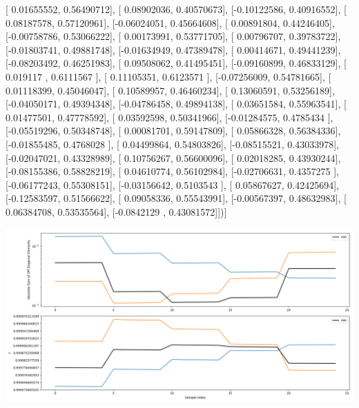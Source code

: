 \documentclass{article}
\begin{document}
       [ 0.01655552,  0.56490712],
       [ 0.08902036,  0.40570673],
       [-0.10122586,  0.40916552],
       [ 0.08187578,  0.57120961],
       [-0.06024051,  0.45664608],
       [ 0.00891804,  0.44246405],
       [-0.00758786,  0.53066222],
       [ 0.00173991,  0.53771705],
       [ 0.00796707,  0.39783722],
       [-0.01803741,  0.49881748],
       [-0.01634949,  0.47389478],
       [ 0.00414671,  0.49441239],
       [-0.08203492,  0.46251983],
       [ 0.09508062,  0.41495451],
       [-0.09160899,  0.46833129],
       [ 0.019117  ,  0.6111567 ],
       [ 0.11105351,  0.6123571 ],
       [-0.07256009,  0.54781665],
       [ 0.01118399,  0.45046047],
       [ 0.10589957,  0.46460234],
       [ 0.13060591,  0.53256189],
       [-0.04050171,  0.49394348],
       [-0.04786458,  0.49894138],
       [ 0.03651584,  0.55963541],
       [ 0.01477501,  0.47778592],
       [ 0.03592598,  0.50341966],
       [-0.01284575,  0.4785434 ],
       [-0.05519296,  0.50348748],
       [ 0.00081701,  0.59147809],
       [ 0.05866328,  0.56384336],
       [-0.01855485,  0.4768028 ],
       [ 0.04499864,  0.54803826],
       [-0.08515521,  0.43033978],
       [-0.02047021,  0.43328989],
       [ 0.10756267,  0.56600096],
       [ 0.02018285,  0.43930244],
       [-0.08155386,  0.58828219],
       [ 0.04610774,  0.56102984],
       [-0.02706631,  0.4357275 ],
       [-0.06177243,  0.55308151],
       [-0.03156642,  0.5103543 ],
       [ 0.05867627,  0.42425694],
       [-0.12583597,  0.51566622],
       [ 0.09058336,  0.55543991],
       [-0.00567397,  0.48632983],
       [ 0.06384708,  0.53535564],
       [-0.0842129 ,  0.43081572]])]
\begin{center}
\includegraphics[scale=.9]{report_pickled_controls188/control_dpn_all.png}

\end{center}
\end{document}
